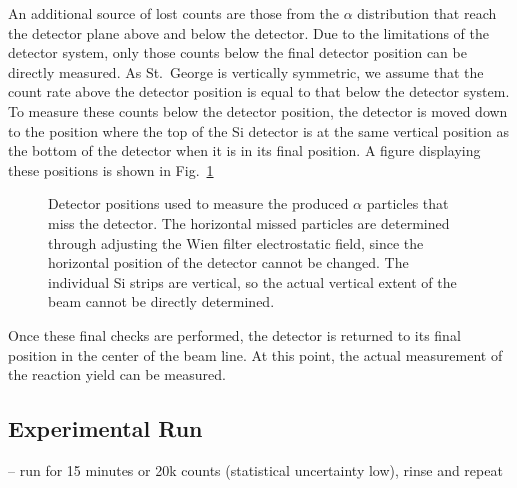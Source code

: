 An additional source of lost counts are those from the $\alpha$
distribution that reach the detector plane above and below the detector.
Due to the limitations of the detector system, only those counts below
the final detector position can be directly measured. As St.\ George is
vertically symmetric, we assume that the count rate above the detector
position is equal to that below the detector system. To measure these
counts below the detector position, the detector is moved down to the
position where the top of the Si detector is at the same vertical
position as the bottom of the detector when it is in its final position.
A figure displaying these positions is shown in
Fig.~\ref{fig:det-position}

\begin{figure}
    \begin{center}
        \label{fig:det-position}
        \caption[Detector positions]{Detector positions used to measure
            the produced $\alpha$ particles that miss the detector. The
            horizontal missed particles are determined through adjusting
            the Wien filter electrostatic field, since the horizontal
            position of the detector cannot be changed. The individual
            Si strips are vertical, so the actual vertical extent of the
            beam cannot be directly determined.}
    \end{center}
\end{figure}

Once these final checks are performed, the detector is returned to its
final position in the center of the beam line. At this point, the actual
measurement of the reaction yield can be measured.

\subsection{Experimental Run}

-- run for 15 minutes or 20k counts (statistical uncertainty low),
   rinse and repeat
